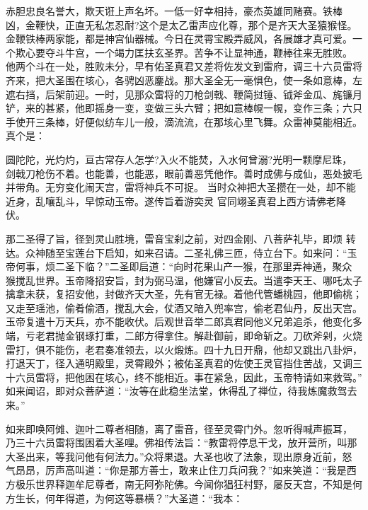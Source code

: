赤胆忠良名誉大，欺天诳上声名坏。一低一好幸相持，豪杰英雄同赌赛。铁棒
凶，金鞭快，正直无私怎忍耐?这个是太乙雷声应化尊，那个是齐天大圣猿猴怪。
金鞭铁棒两家能，都是神宫仙器械。今日在灵霄宝殿弄威风，各展雄才真可爱。一
个欺心要夺斗牛宫，一个竭力匡扶玄圣界。苦争不让显神通，鞭棒往来无胜败。
他两个斗在一处，胜败未分，早有佑圣真君又差将佐发文到雷府，调三十六员雷将
齐来，把大圣围在垓心，各骋凶恶鏖战。那大圣全无一毫惧色，使一条如意棒，左
遮右挡，后架前迎。一时，见那众雷将的刀枪剑戟、鞭简挝锤、钺斧金瓜、旄镰月
铲，来的甚紧，他即摇身一变，变做三头六臂；把如意棒幌一幌，变作三条；六只
手使开三条棒，好便似纺车儿一般，滴流流，在那垓心里飞舞。众雷神莫能相近。
真个是：

圆陀陀，光灼灼，亘古常存人怎学?入火不能焚，入水何曾溺?光明一颗摩尼珠，
剑戟刀枪伤不着。也能善，也能恶，眼前善恶凭他作。善时成佛与成仙，恶处披毛
并带角。无穷变化闹天宫，雷将神兵不可捉。
当时众神把大圣攒在一处，却不能近身，乱嚷乱斗，早惊动玉帝。遂传旨着游奕灵
官同翊圣真君上西方请佛老降伏。

那二圣得了旨，径到灵山胜境，雷音宝刹之前，对四金刚、八菩萨礼毕，即烦
转达。众神随至宝莲台下启知，如来召请。二圣礼佛三匝，侍立台下。如来问：“玉
帝何事，烦二圣下临？”二圣即启道：“向时花果山产一猴，在那里弄神通，聚众
猴搅乱世界。玉帝降招安旨，封为弼马温，他嫌官小反去。当遣李天王、哪吒太子
擒拿未获，复招安他，封做齐天大圣，先有官无禄。着他代管蟠桃园，他即偷桃；
又走至瑶池，偷肴偷酒，搅乱大会，仗酒又暗入兜率宫，偷老君仙丹，反出天宫。
玉帝复遣十万天兵，亦不能收伏。后观世音举二郎真君同他义兄弟追杀，他变化多
端，亏老君抛金钢琢打重，二郎方得拿住。解赴御前，即命斩之。刀砍斧剁，火烧
雷打，俱不能伤，老君奏准领去，以火煅炼。四十九日开鼎，他却又跳出八卦炉，
打退天丁，径入通明殿里，灵霄殿外；被佑圣真君的佐使王灵官挡住苦战，又调三
十六员雷将，把他困在垓心，终不能相近。事在紧急，因此，玉帝特请如来救驾。”
如来闻诏，即对众菩萨道：“汝等在此稳坐法堂，休得乱了禅位，待我炼魔救驾去
来。”

如来即唤阿傩、迦叶二尊者相随，离了雷音，径至灵霄门外。忽听得喊声振耳，
乃三十六员雷将围困着大圣哩。佛祖传法旨：“教雷将停息干戈，放开营所，叫那
大圣出来，等我问他有何法力。”众将果退。大圣也收了法象，现出原身近前，怒
气昂昂，厉声高叫道：“你是那方善士，敢来止住刀兵问我？”如来笑道：“我是西
方极乐世界释迦牟尼尊者，南无阿弥陀佛。今闻你猖狂村野，屡反天宫，不知是何
方生长，何年得道，为何这等暴横？”大圣道：“我本：

